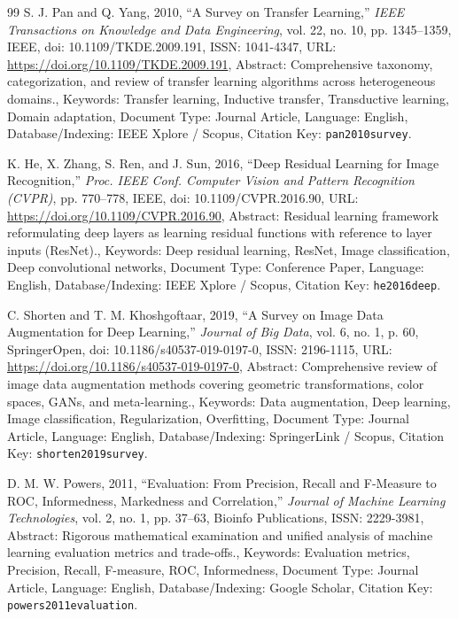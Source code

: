 \documentclass[10pt,a4paper]{article}
\begin{document}
\begin{thebibliography}{99}
S. J. Pan and Q. Yang, 2010, ``A Survey on Transfer Learning,'' \textit{IEEE Transactions on Knowledge and Data Engineering}, vol. 22, no. 10, pp. 1345--1359, IEEE, doi: 10.1109/TKDE.2009.191, ISSN: 1041-4347, URL: \url{https://doi.org/10.1109/TKDE.2009.191}, Abstract: Comprehensive taxonomy, categorization, and review of transfer learning algorithms across heterogeneous domains., Keywords: Transfer learning, Inductive transfer, Transductive learning, Domain adaptation, Document Type: Journal Article, Language: English, Database/Indexing: IEEE Xplore / Scopus, Citation Key: \texttt{pan2010survey}.

K. He, X. Zhang, S. Ren, and J. Sun, 2016, ``Deep Residual Learning for Image Recognition,'' \textit{Proc. IEEE Conf. Computer Vision and Pattern Recognition (CVPR)}, pp. 770--778, IEEE, doi: 10.1109/CVPR.2016.90, URL: \url{https://doi.org/10.1109/CVPR.2016.90}, Abstract: Residual learning framework reformulating deep layers as learning residual functions with reference to layer inputs (ResNet)., Keywords: Deep residual learning, ResNet, Image classification, Deep convolutional networks, Document Type: Conference Paper, Language: English, Database/Indexing: IEEE Xplore / Scopus, Citation Key: \texttt{he2016deep}.

C. Shorten and T. M. Khoshgoftaar, 2019, ``A Survey on Image Data Augmentation for Deep Learning,'' \textit{Journal of Big Data}, vol. 6, no. 1, p. 60, SpringerOpen, doi: 10.1186/s40537-019-0197-0, ISSN: 2196-1115, URL: \url{https://doi.org/10.1186/s40537-019-0197-0}, Abstract: Comprehensive review of image data augmentation methods covering geometric transformations, color spaces, GANs, and meta-learning., Keywords: Data augmentation, Deep learning, Image classification, Regularization, Overfitting, Document Type: Journal Article, Language: English, Database/Indexing: SpringerLink / Scopus, Citation Key: \texttt{shorten2019survey}.

D. M. W. Powers, 2011, ``Evaluation: From Precision, Recall and F-Measure to ROC, Informedness, Markedness and Correlation,'' \textit{Journal of Machine Learning Technologies}, vol. 2, no. 1, pp. 37--63, Bioinfo Publications, ISSN: 2229-3981, Abstract: Rigorous mathematical examination and unified analysis of machine learning evaluation metrics and trade-offs., Keywords: Evaluation metrics, Precision, Recall, F-measure, ROC, Informedness, Document Type: Journal Article, Language: English, Database/Indexing: Google Scholar, Citation Key: \texttt{powers2011evaluation}.
\end{thebibliography}
\endgroup
\end{document}

